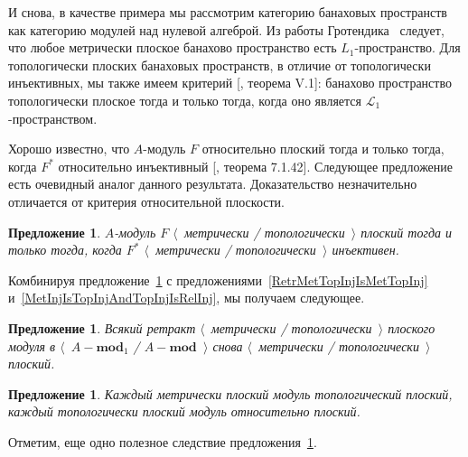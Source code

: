 \documentclass[12pt]{article}
\newtheorem{proposition}[theorem]{Предложение}
\begin{document}
И снова, в качестве примера мы рассмотрим категорию банаховых пространств как
категорию модулей над нулевой алгеброй. Из работы
Гротендика~\cite{GrothMetrProjFlatBanSp} следует, что любое метрически плоское
банахово пространство есть $L_1$-пространство. Для топологически плоских
банаховых пространств, в отличие от топологически инъективных, мы также имеем
критерий [\cite{StegRethNucOpL1LInfSp}, теорема V.1]: банахово пространство
топологически плоское тогда и только тогда, когда оно является
$\mathscr{L}_1$-пространством.

Хорошо известно, что $A$-модуль $F$ относительно плоский тогда и только тогда,
когда $F^*$ относительно инъективный [\cite{HelBanLocConvAlg}, теорема 7.1.42].
Следующее предложение есть очевидный аналог данного результата. Доказательство
незначительно отличается от критерия относительной плоскости.

\begin{proposition}\label{MetTopFlatCharac} $A$-модуль $F$ $\langle$~метрически
    / топологически~$\rangle$ плоский тогда и только тогда, когда $F^*$
    $\langle$~метрически / топологически~$\rangle$ инъективен.
\end{proposition}

Комбинируя предложение~\ref{MetTopFlatCharac} с
предложениями~\ref{RetrMetTopInjIsMetTopInj}
и~\ref{MetInjIsTopInjAndTopInjIsRelInj}, мы получаем следующее.

\begin{proposition}\label{RetrMetTopFlatIsMetTopFlat} Всякий ретракт
    $\langle$~метрически / топологически~$\rangle$ плоского модуля в
    $\langle$~$A-\mathbf{mod}_1$ / $A-\mathbf{mod}$~$\rangle$ снова
    $\langle$~метрически / топологически~$\rangle$ плоский.
\end{proposition}

\begin{proposition}\label{MetFlatIsTopFlatAndTopFlatIsRelFlat} Каждый метрически
    плоский модуль топологический плоский, каждый топологически плоский модуль
    относительно плоский.
\end{proposition}

Отметим, еще одно полезное следствие предложения~\ref{MetTopFlatCharac}.
\end{document}
